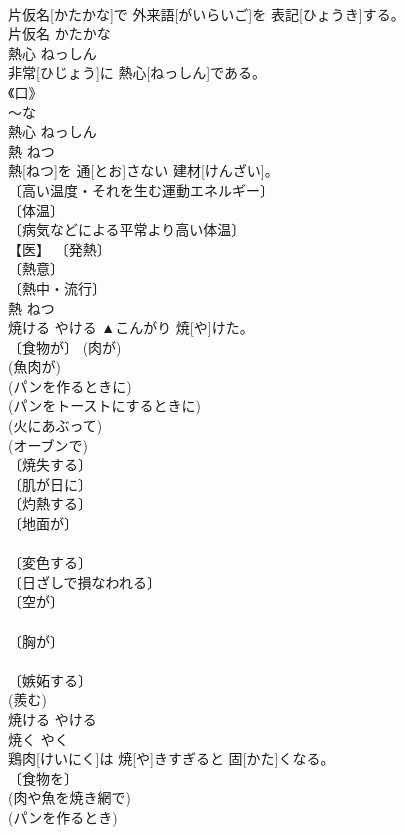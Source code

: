 \documentclass[8pt]{extreport}
\begin{document}
\begin{CJK}{UTF8}{min}
\\	片仮名[かたかな]で 外来語[がいらいご]を 表記[ひょうき]する。	
\\	片仮名	かたかな	
\\	熱心	ねっしん	
\\	非常[ひじょう]に 熱心[ねっしん]である。	
\\	《口》 
\\	～な 
\\	熱心	ねっしん	
\\	熱	ねつ	
\\	熱[ねつ]を 通[とお]さない 建材[けんざい]。	
\\	〔高い温度・それを生む運動エネルギー〕 
\\	〔体温〕 
\\	〔病気などによる平常より高い体温〕 
\\	【医】 〔発熱〕 
\\	〔熱意〕 
\\	〔熱中・流行〕 
\\	熱	ねつ	
\\	焼ける	やける	▲こんがり 焼[や]けた。	
\\	〔食物が〕 (肉が) 
\\	(魚肉が) 
\\	(パンを作るときに) 
\\	(パンをトーストにするときに) 
\\	(火にあぶって) 
\\	(オーブンで) 
\\	〔焼失する〕 
\\	〔肌が日に〕 
\\	〔灼熱する〕 
\\	〔地面が〕 
\\	[⇒ひやけ] 
\\	〔変色する〕 
\\	〔日ざしで損なわれる〕 
\\	〔空が〕 
\\	[⇒あさやけ, ゆうやけ] 
\\	〔胸が〕 
\\	[⇒むねやけ] 
\\	〔嫉妬する〕 
\\	(羨む) 
\\	焼ける	やける	
\\	焼く	やく	
\\	鶏肉[けいにく]は 焼[や]きすぎると 固[かた]くなる。	
\\	〔食物を〕 
\\	(肉や魚を焼き網で) 
\\	(パンを作るとき) 

\end{CJK}
\end{document}
